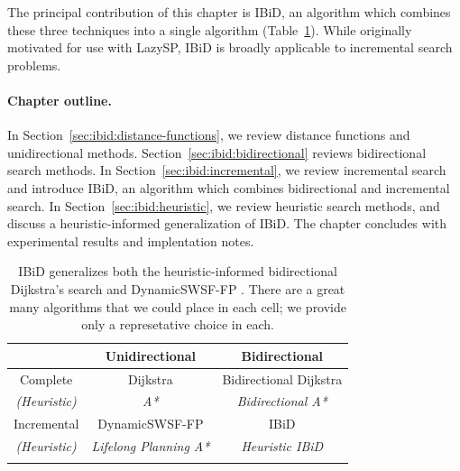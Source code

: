 The principal contribution of this chapter is IBiD,
an algorithm which combines these three techniques into a single
algorithm
(Table~\ref{tab:ibid:alg-overview}).
While originally motivated for use with LazySP,
IBiD is broadly applicable to incremental search problems.

\paragraph{Chapter outline.}
In Section~\ref{sec:ibid:distance-functions},
we review distance functions and unidirectional methods.
Section~\ref{sec:ibid:bidirectional} reviews
bidirectional search methods.
In Section~\ref{sec:ibid:incremental},
we review incremental search
and introduce IBiD,
an algorithm which combines bidirectional and incremental search.
In Section~\ref{sec:ibid:heuristic},
we review heuristic search methods,
and discuss a heuristic-informed generalization of IBiD.
The chapter concludes with experimental results and implentation notes.

\begin{table}
   \centering
   \begin{tabular}{ccc}
      \toprule
      & Unidirectional & Bidirectional \\
      \midrule
      \addlinespace[0.2em]
      Complete
         & Dijkstra \citep{dijkstra1959anote}
         & Bidirectional Dijkstra \citep{luby1989bidijk} \\
      \addlinespace[-0.2em]
      \emph{(Heuristic)}
         & \emph{A* \citep{hart1968astar}}
         & \emph{Bidirectional A* \citep{ikeda1994betterroutes}} \\
      \addlinespace[0.3em]
      Incremental
         & DynamicSWSF-FP \citep{ramalingam1996dynamicswsffp}
         & {IBiD} \\
      \addlinespace[-0.2em]
      \emph{(Heuristic)}
         & \emph{Lifelong Planning A* \citep{koenig2004lpastar}}
         & \emph{Heuristic IBiD} \\
      \addlinespace[0.2em]
      \bottomrule
   \end{tabular}
   \caption{
      IBiD generalizes both the heuristic-informed
      bidirectional Dijkstra's search \citep{goldberg2005spexternalmemory}
      and DynamicSWSF-FP \citep{ramalingam1996dynamicswsffp}.
      There are a great many algorithms that we could place in each cell;
      we provide only a represetative choice in each.}
   \label{tab:ibid:alg-overview}
\end{table}

